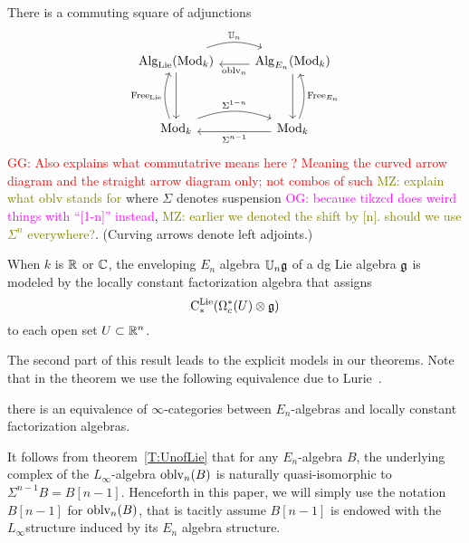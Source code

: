 \documentclass[11pt]{amsart}
\numberwithin{equation}{section}
\def\owen{\textcolor{magenta}{OG: }\textcolor{magenta}}
\def\mahmoud{\textcolor{olive}{MZ: }\textcolor{olive}}
\def\greg{\textcolor{red}{GG: }\textcolor{red}}
\begin{document}
\begin{thm}\label{T:UnofLie}
There is a commuting square of adjunctions
\[
\begin{tikzcd}
\Alg_\Lie(\Mod_k) \arrow[r, bend left=20, shift left=.5ex,"\UU_n"] \arrow[dd] & \Alg_{E_n}(\Mod_k) \arrow[l, shift left=.5ex, "\oblv_n"] \arrow[dd]\\
&\\
\Mod_k \arrow[r, bend left=20, shift left=.5ex, "\Sigma^{1-n}"] \arrow[uu, bend left=20, shift left=.5ex, "\Free_\Lie"] & \Mod_k \arrow[l, shift left=.5ex,"\Sigma^{n-1}"] \arrow[uu, bend right=20, shift right=.5ex, "\Free_{E_n}"']
\end{tikzcd}
\]
\greg{Also explains what commutatrive means here ? Meaning the curved arrow diagram and the straight arrow diagram only; not combos of such}
\mahmoud{explain what oblv stands for}
where $\Sigma$ denotes suspension \owen{because tikzcd does weird things with ``[1-n]'' instead}, \mahmoud{earlier we denoted the shift by [n]. should we use $\Sigma^n$ everywhere?}.
(Curving arrows denote left adjoints.)

When $k$ is $\mathbb R$ or $\mathbb C$, 
the enveloping $E_n$ algebra $\mathbb U_n \mathfrak g$ of a dg Lie algebra $\mathfrak g$ is modeled by the locally constant factorization algebra that assigns
\[
{\rm C}^{\rm Lie}_*(\Omega^*_c(U) \otimes \mathfrak g)
\]
to each open set $U \subset \mathbb R^n$.
\end{thm}



The second part of this result leads to the explicit models in our theorems.
Note that in the theorem we use the following equivalence due to Lurie~\cite{LurieHA}. 
\begin{thm}\label{T:En=Fac} there is an equivalence of $\infty$-categories between $E_n$-algebras and locally constant factorization algebras.
\end{thm}
\begin{rmk}
 It follows from theorem~\ref{T:UnofLie} that for any $E_n$-algebra $B$, the underlying complex of the $L_\infty$-algebra ${\rm oblv}_n(B)$ is naturally quasi-isomorphic to 
 $\Sigma^{n-1}B = B[n-1]$. Henceforth in this paper, we will simply use the notation  $B[n-1]$ for ${\rm oblv}_n(B)$, that is tacitly assume 
 $B[n-1]$ is endowed with the $L_\infty$structure induced by its $E_n$ algebra structure.
\end{rmk}
\end{document}
